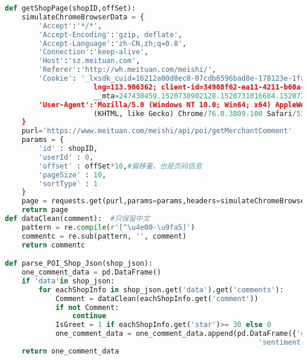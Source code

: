 \documentclass[withoutpreface,bwprint]{cumcmthesis} %
\begin{document}
\begin{appendices}
\begin{lstlisting}[language=python]
def getShopPage(shopID,offSet):
    simulateChromeBrowserData = {
        'Accept':'*/*',
        'Accept-Encoding':'gzip, deflate',
        'Accept-Language':'zh-CN,zh;q=0.8',
        'Connection':'keep-alive',
        'Host':'sz.meituan.com',
        'Referer':'http://wh.meituan.com/meishi/',
        'Cookie': '_lxsdk_cuid=16212a00d8ec8-07cdb6596bad8e-178123e-1fa400-16212a00d8fc8; lat=22.780886;
                     lng=113.906362; client-id=34908f62-ea11-4211-b60a-f62c32288b2e; uuid=9be4f96971ac4c9cab4c.1520730903.1.0.0; webloc_geo=22.527181%2C113.938582%2Cwgs84; ci=30; _lxsdk=16212a1cddfc8-011369480302e7-178123e-1fa400-16212a1cddfc8; 
                     __mta=247430459.1520730902128.1520731016684.1520731025187.5; _lxsdk_s=16212a00d8f-c83-6e-376%7C%7C9',
        'User-Agent':'Mozilla/5.0 (Windows NT 10.0; Win64; x64) AppleWebKit/537.36 
                     (KHTML, like Gecko) Chrome/76.0.3809.100 Safari/537.36'
    }
    purl='https://www.meituan.com/meishi/api/poi/getMerchantComment'
    params = {
        'id' : shopID,
        'userId' : 0,
        'offset' : offSet*10,#偏移量，也是页码信息
        'pageSize' : 10,
        'sortType' : 1
    }
    page = requests.get(purl,params=params,headers=simulateChromeBrowserData)
    return page
def dataClean(comment):  #只保留中文
    pattern = re.compile(r'[^\u4e00-\u9fa5]')
    commentc = re.sub(pattern, '', comment)
    return commentc

def parse_POI_Shop_Json(shop_json):
    one_comment_data = pd.DataFrame()
    if 'data'in shop_json:
        for eachShopInfo in shop_json.get('data').get('comments'):
            Comment = dataClean(eachShopInfo.get('comment'))
            if not Comment:
                continue
            IsGreet = 1 if eachShopInfo.get('star')>= 30 else 0
            one_comment_data = one_comment_data.append(pd.DataFrame({'comment':[Comment],
                                                            'sentiment':[IsGreet]}))
    return one_comment_data
\end{lstlisting}





\end{appendices}
\end{document}
